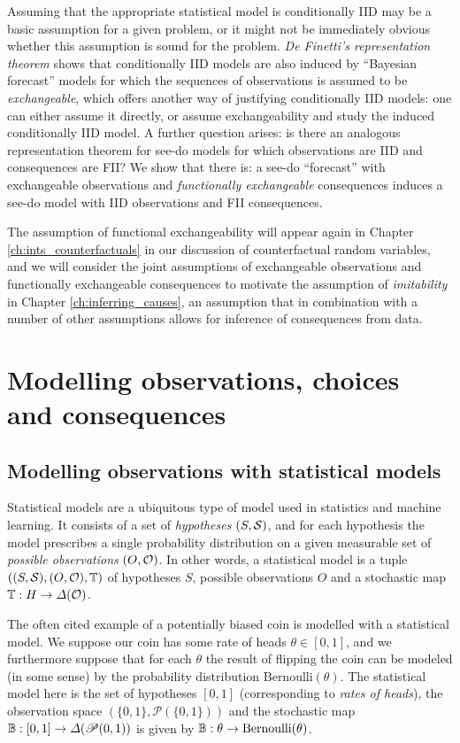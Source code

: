 Assuming that the appropriate statistical model is conditionally IID may be a basic assumption for a given problem, or it might not be immediately obvious whether this assumption is sound for the problem. \emph{De Finetti's representation theorem} shows that conditionally IID models are also induced by ``Bayesian forecast'' models for which the sequences of observations is assumed to be \emph{exchangeable}, which offers another way of justifying conditionally IID models: one can either assume it directly, or assume exchangeability and study the induced conditionally IID model. A further question arises: is there an analogous representation theorem for see-do models for which observations are IID and consequences are FII? We show that there is: a see-do ``forecast'' with exchangeable observations and \emph{functionally exchangeable} consequences induces a see-do model with IID observations and FII consequences.

The assumption of functional exchangeability will appear again in Chapter \ref{ch:ints_counterfactuals} in our discussion of counterfactual random variables, and we will consider the joint assumptions of exchangeable observations and functionally exchangeable consequences to motivate the assumption of \emph{imitability} in Chapter \ref{ch:inferring_causes}, an assumption that in combination with a number of other assumptions allows for inference of consequences from data.

\section{Modelling observations, choices and consequences}

\subsection{Modelling observations with statistical models}

Statistical models are a ubiquitous type of model used in statistics and machine learning. It consists of a set of \emph{hypotheses} $(S,\mathcal{S})$, and for each hypothesis the model prescribes a single probability distribution on a given measurable set of \emph{possible observations} $(O,\mathcal{O})$. In other words, a statistical model is a tuple $((S,\mathcal{S}),(O,\mathcal{O}),\mathbb{T})$ of hypotheses $S$, possible observations $O$ and a stochastic map $\mathbb{T}:H\to \Delta(\mathcal{O})$.

The often cited example of a potentially biased coin is modelled with a statistical model. We suppose our coin has some rate of heads $\theta\in [0,1]$, and we furthermore suppose that for each $\theta$ the result of flipping the coin can be modeled (in some sense) by the probability distribution $\text{Bernoulli}(\theta)$. The statistical model here is the set of hypotheses $[0,1]$ (corresponding to \emph{rates of heads}), the observation space $(\{0,1\},\mathscr{P}(\{0,1\}))$ and the stochastic map $\mathbb{B}:[0,1]\to \Delta(\mathscr{P}(0,1))$ is given by $\mathbb{B}:\theta\to \text{Bernoulli}(\theta)$.

